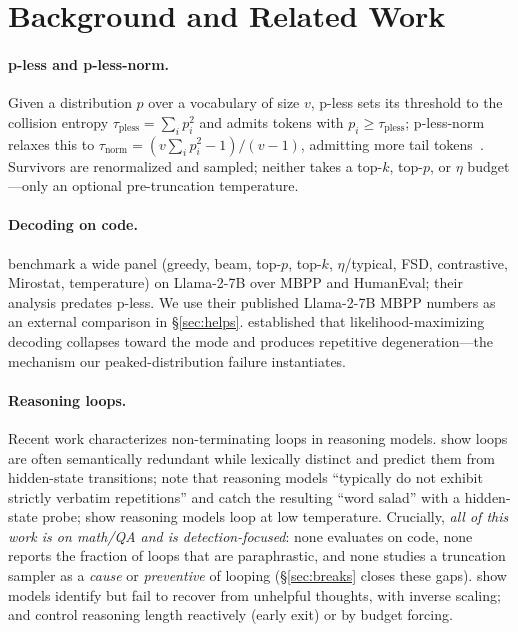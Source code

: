 \documentclass[11pt]{article}                       %
\newcommand{\tsum}{\ensuremath{\textstyle\sum}}
\begin{document}
\section{Background and Related Work}\label{sec:bg}
\paragraph{p-less and p-less-norm.} Given a distribution $p$ over a vocabulary of size $v$, p-less
sets its threshold to the collision entropy $\tau_{\text{pless}}=\tsum_i p_i^2$ and admits tokens with
$p_i \ge \tau_{\text{pless}}$; p-less-norm relaxes this to
$\tau_{\text{norm}}=(v\tsum_i p_i^2 - 1)/(v-1)$, admitting more tail tokens~\citep{tan2025pless}.
Survivors are renormalized and sampled; neither takes a top-$k$, top-$p$, or $\eta$ budget---only an
optional pre-truncation temperature.

\paragraph{Decoding on code.} \citet{shi2024decoding} benchmark a wide panel (greedy, beam, top-$p$,
top-$k$, $\eta$/typical, FSD, contrastive, Mirostat, temperature) on Llama-2-7B over MBPP and
HumanEval; their analysis predates p-less. We use their published Llama-2-7B MBPP numbers as an
external comparison in \S\ref{sec:helps}. \citet{holtzman2020curious} established that
likelihood-maximizing decoding collapses toward the mode and produces repetitive degeneration---the
mechanism our peaked-distribution failure instantiates.

\paragraph{Reasoning loops.} Recent work characterizes non-terminating loops in reasoning models.
\citet{duan2026circular} show loops are often semantically redundant while lexically distinct and
predict them from hidden-state transitions; \citet{xie2025wordsalad} note that reasoning models
``typically do not exhibit strictly verbatim repetitions'' and catch the resulting ``word salad''
with a hidden-state probe; \citet{pipis2025loop} show reasoning models loop at low temperature.
Crucially, \emph{all of this work is on math/QA and is detection-focused}: none evaluates on code,
none reports the fraction of loops that are paraphrastic, and none studies a truncation sampler as a
\emph{cause} or \emph{preventive} of looping (\S\ref{sec:breaks} closes these gaps).
\citet{yang2025recover} show models identify but fail to recover from unhelpful thoughts, with
inverse scaling; \citet{yang2025deer} and \citet{muennighoff2025s1} control reasoning length
reactively (early exit) or by budget forcing.
\end{document}
